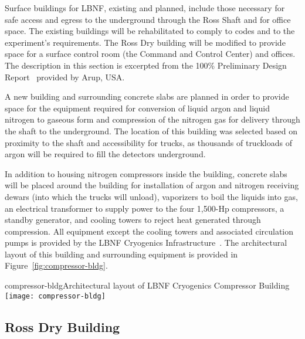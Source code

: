 Surface buildings for LBNF, existing and planned, include those necessary for safe access and egress to the underground through the Ross Shaft and for office space. The existing buildings will be rehabilitated to comply to codes and to the experiment's requirements. 
The Ross Dry building will be modified to provide space for a surface control room (the Command and Control Center) and offices. The description in this section is excerpted from the 100\% Preliminary Design Report~\cite{arup-100-2011-3a} provided by Arup, USA.

A new building and surrounding concrete slabs are planned in order to provide space for the equipment required for %
conversion of liquid argon and liquid nitrogen to gaseous form and compression of the nitrogen gas for delivery through the shaft to the underground. %
The location of this building was selected based on proximity to the shaft and  accessibility for trucks, as thousands of truckloads of argon will be required to fill the detectors underground.

In addition to housing nitrogen compressors inside the building, concrete slabs %
will be placed around the building %
for installation of argon and nitrogen receiving dewars (into which the trucks will unload), vaporizers to boil the liquids into gas, an electrical transformer to supply power to the four 1,500-Hp compressors, a standby generator, and cooling towers to reject heat generated through compression. All equipment except the cooling towers and associated circulation pumps is provided by the LBNF Cryogenics Infrastructure~\cite{cryo-design-rpt}. The architectural layout of this building and surrounding equipment is provided in Figure~\ref{fig:compressor-bldg}. 

\begin{cdrfigure}{compressor-bldg}{Architectural layout of LBNF Cryogenics Compressor Building}
\texttt{[image: compressor-bldg]}
\end{cdrfigure}


\subsection{Ross Dry Building}
\label{sec:fscf-surf-facil-surface-bldg-rossdry}

